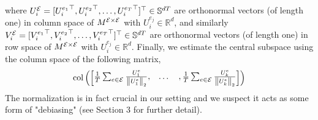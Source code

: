 where $U^{\mathcal{E}}_i = [{U_i^{e_1}}^{\top}, {U_i^{e_2}}^{\top}, \dots, {U_i^{e_T}}^{\top}]^{\top} \in \mathbb{S}^{dT} $ are orthonormal vectors (of length one) in column space of $M^{\mathcal{E} \times \mathcal{E}}$ with $U_i^{e_j} \in \mathbb{R}^d$, 
and similarly $V^{\mathcal{E}}_i = [{V_i^{e_1}}^{\top}, {V_i^{e_2}}^{\top}, \dots, {V_i^{e_T}}^{\top}]^{\top} \in \mathbb{S}^{dT} $ are orthonormal vectors (of length one) in row space of $M^{\mathcal{E} \times \mathcal{E}}$ with $U_i^{e_j} \in \mathbb{R}^d$. 
Finally, we estimate the central subspace using the column space of the following matrix,
\begin{equation*}
    \operatorname{col} \left( 
    \begin{bmatrix}
        \frac{1}{T} \sum_{e \in \mathcal{E}}\frac{U_1^{e}}{ \left\| U_1^{e} \right\|_{ {2} } }, & \dots & , \frac{1}{T} \sum_{e \in \mathcal{E}} \frac{U_k^{e}}{ \left\| U_k^{e} \right\|_{ {2} } } 
    \end{bmatrix}
    \right)
\end{equation*}
The normalization is in fact crucial in our setting and we suspect it acts as some form of "debiasing" (see Section 3 for further detail).
 



